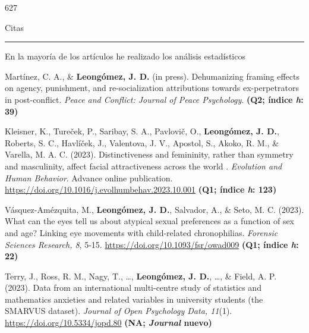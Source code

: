\documentclass[11pt,a4paper,]{awesome-cv}
\begin{document}
\begin{tcolorbox}[enhanced,
        on line, 
        boxsep=4pt, left=0pt,right=0pt,top=0pt,bottom=0pt,
        colframe=white,colback=blue,
        hyperurl={https://scholar.google.com/citations?user=8Q0jKHsAAAAJ}]
\begin{minipage}[c]{0.12\linewidth}
\end{minipage} \begin{minipage}[c]{0.18\linewidth}  
  \begin{center} \begin{huge} 627 \end{huge} 
  \begin{small} Citas \end{small} \end{center}
\end{minipage}
\begin{center}
\noindent\rule{8cm}{0.4pt}
\end{center}
\begin{center}
\footnotesize{En la mayoría de los artículos he realizado los análisis estadísticos}\end{center}
\end{tcolorbox}

\begingroup
\footnotesize
\setlength{\parindent}{-0.5in}
\setlength{\leftskip}{0.5in}

Martínez, C. A., \& \textbf{Leongómez, J. D.} (in press). Dehumanizing
framing effects on agency, punishment, and re-socialization attributions
towards ex-perpetrators in post-conflict. \emph{Peace and Conflict:
Journal of Peace Psychology}. \textbf{(Q2; índice \emph{h}: 39)}

Kleisner, K., Tureček, P., Saribay, S. A., Pavlovič, O.,
\textbf{Leongómez, J. D.}, Roberts, S. C., Havlíček, J., Valentova, J.
V., Apostol, S., Akoko, R. M., \& Varella, M. A. C. (2023).
Distinctiveness and femininity, rather than symmetry and masculinity,
affect facial attractiveness across the world . \emph{Evolution and
Human Behavior}. Advance online publication.
\href{https://authors.elsevier.com/c/1hyfr3tz492kal}{https://doi.org/10.1016/j.evolhumbehav.2023.10.001}
\textbf{(Q1; índice \emph{h}: 123)}

Vásquez-Amézquita, M., \textbf{Leongómez, J. D.}, Salvador, A., \& Seto,
M. C. (2023). What can the eyes tell us about atypical sexual
preferences as a function of sex and age? Linking eye movements with
child-related chronophilias. \emph{Forensic Sciences Research, 8}, 5-15.
\url{https://doi.org/10.1093/fsr/owad009} \textbf{(Q1; índice \emph{h}:
22)}

Terry, J., Ross, R. M., Nagy, T., \ldots, \textbf{Leongómez, J. D.},
\ldots, \& Field, A. P. (2023). Data from an international multi-centre
study of statistics and mathematics anxieties and related variables in
university students (the SMARVUS dataset). \emph{Journal of Open
Psychology Data, 11}(1). \url{https://doi.org/10.5334/jopd.80}
\textbf{(NA; \emph{Journal} nuevo)}
\end{document}
